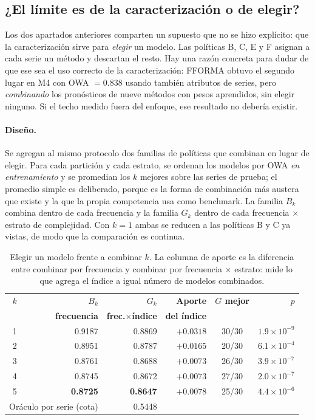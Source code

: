 \subsection{¿El límite es de la caracterización o de elegir?}\label{sec:combinar}

Los dos apartados anteriores comparten un supuesto que no se hizo explícito: que la
caracterización sirve para \emph{elegir} un modelo. Las políticas B, C, E y F asignan a
cada serie un método y descartan el resto. Hay una razón concreta para dudar de que ese
sea el uso correcto de la caracterización: FFORMA \cite{monteromanso2020} obtuvo el
segundo lugar en M4 con OWA $=0.838$ usando también atributos de series, pero
\emph{combinando} los pronósticos de nueve métodos con pesos aprendidos, sin elegir
ninguno. Si el techo medido fuera del enfoque, ese resultado no debería existir.

\paragraph{Diseño.} Se agregan al mismo protocolo dos familias de políticas que
combinan en lugar de elegir. Para cada partición y cada estrato, se ordenan los modelos
por OWA \emph{en entrenamiento} y se promedian los $k$ mejores sobre las series de
prueba; el promedio simple es deliberado, porque es la forma de combinación más austera
que existe y la que la propia competencia usa como benchmark. La familia $B_k$ combina
dentro de cada frecuencia y la familia $G_k$ dentro de cada frecuencia $\times$ estrato
de complejidad. Con $k=1$ ambas se reducen a las políticas B y C ya vistas, de modo que
la comparación es continua.

\begin{table}[htbp]
\centering
\caption{Elegir un modelo frente a combinar $k$. La columna de aporte es la diferencia
entre combinar por frecuencia y combinar por frecuencia $\times$ estrato: mide lo que
agrega el índice a igual número de modelos combinados.}
\label{tab:combinar}
\begin{tabular}{crrrcr}
\toprule
$k$ & \textbf{$B_k$} & \textbf{$G_k$} & \textbf{Aporte} &
\textbf{$G$ mejor} & \textbf{$p$} \\
  & \textbf{frecuencia} & \textbf{frec.$\times$índice} & \textbf{del índice} & & \\
\midrule
1 & 0.9187 & 0.8869 & $+0.0318$ & 30/30 & $1.9\times10^{-9}$ \\
2 & 0.8951 & 0.8787 & $+0.0165$ & 20/30 & $6.1\times10^{-4}$ \\
3 & 0.8761 & 0.8688 & $+0.0073$ & 26/30 & $3.9\times10^{-7}$ \\
4 & 0.8745 & 0.8672 & $+0.0073$ & 27/30 & $2.0\times10^{-7}$ \\
5 & \textbf{0.8725} & \textbf{0.8647} & $+0.0078$ & 25/30 & $4.4\times10^{-6}$ \\
\midrule
\multicolumn{2}{l}{Oráculo por serie (cota)} & 0.5448 & & & \\
\bottomrule
\end{tabular}
\end{table}

